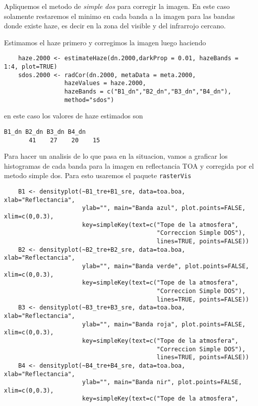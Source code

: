 \begin{exa}
    Apliquemos el metodo de \emph{simple dos} para corregir la imagen. En este caso
    solamente restaremos el minimo en cada banda a la imagen para las bandas
    donde existe haze, es decir en la zona del visible y del infrarrojo cercano.

    Estimamos el haze primero y corregimos la imagen luego haciendo
    \begin{lstlisting}
    haze.2000 <- estimateHaze(dn.2000,darkProp = 0.01, hazeBands = 1:4, plot=TRUE)
    sdos.2000 <- radCor(dn.2000, metaData = meta.2000,
                 hazeValues = haze.2000,
                 hazeBands = c("B1_dn","B2_dn","B3_dn","B4_dn"),
                 method="sdos")
    \end{lstlisting}
    en este caso los valores de haze estimados son
    \begin{Verbatim}[fontsize=\small]
    B1_dn B2_dn B3_dn B4_dn
       41    27    20    15
    \end{Verbatim}
    Para hacer un analisis de lo que pasa en la situacion, vamos a graficar los
    histogramas de cada banda para la imagen en reflectancia TOA y corregida por
    el metodo simple dos. Para esto usaremos el paquete \texttt{rasterVis}
    \begin{lstlisting}
    B1 <- densityplot(~B1_tre+B1_sre, data=toa.boa, xlab="Reflectancia",
                      ylab="", main="Banda azul", plot.points=FALSE, xlim=c(0,0.3),
                      key=simpleKey(text=c("Tope de la atmosfera",
                                           "Correccion Simple DOS"),
                                           lines=TRUE, points=FALSE))
    B2 <- densityplot(~B2_tre+B2_sre, data=toa.boa, xlab="Reflectancia",
                      ylab="", main="Banda verde", plot.points=FALSE, xlim=c(0,0.3),
                      key=simpleKey(text=c("Tope de la atmosfera",
                                           "Correccion Simple DOS"),
                                           lines=TRUE, points=FALSE))
    B3 <- densityplot(~B3_tre+B3_sre, data=toa.boa, xlab="Reflectancia",
                      ylab="", main="Banda roja", plot.points=FALSE, xlim=c(0,0.3),
                      key=simpleKey(text=c("Tope de la atmosfera",
                                           "Correccion Simple DOS"),
                                           lines=TRUE, points=FALSE))
    B4 <- densityplot(~B4_tre+B4_sre, data=toa.boa, xlab="Reflectancia",
                      ylab="", main="Banda nir", plot.points=FALSE, xlim=c(0,0.3),
                      key=simpleKey(text=c("Tope de la atmosfera",

\end{lstlisting}
\end{exa}
